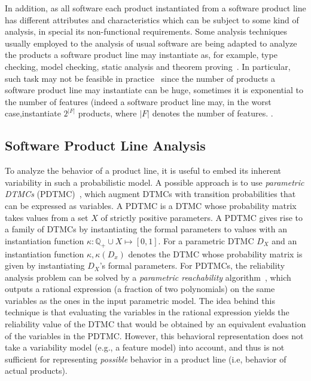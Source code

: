 In addition,  as all software each product instantiated from a software product line has
 different attributes and characteristics which can be subject to some kind of
 analysis, in special its non-functional requirements. Some analysis techniques
 usually employed to the analysis of usual software are being adapted to analyze
 the products a software product line may instantiate as, for example, type
 checking, model checking, static analysis and theorem
 proving~\cite{thum_classification_2014}. In particular, such task may not be
 feasible in practice~\cite{classen_featured_2013} since  the number of
 products a software product line may instantiate can be huge, sometimes it is
 exponential to the number of features (indeed a software product line may, in
 the worst case,instantiate $2^{|F|}$ products, where $|F|$ denotes the number
 of features.  . 






\subsection{ Software Product Line Analysis
	\label{subsec:softwareProductLineAnalysis}}

To analyze the behavior of a product line, it is useful to embed its inherent
variability in such a probabilistic model.  A possible approach is to use
\textit{parametric DTMCs} (PDTMC)~\cite{daws_pmc}, which augment DTMCs with
transition probabilities that can be expressed as variables. A PDTMC is a DTMC
whose probability matrix takes values from a set $X$ of strictly positive
parameters. A PDTMC gives rise to a family of DTMCs by instantiating the formal
parameters to values with an instantiation function $\kappa : \mathbb{Q}_+ \cup
X \mapsto [0,1]$. For a parametric DTMC $D_X$ and an instantiation function
$\kappa, \kappa(D_x)$ denotes the DTMC whose probability matrix is given by
instantiating $D_X$'s formal parameters. For PDTMCs, the reliability analysis
problem can be solved by a \emph{parametric reachability}
algorithm~\cite{HahnHZ10}, which outputs a rational expression (a fraction of
two polynomials) on the same variables as the ones in the input parametric
model.  The idea behind this technique is that evaluating the variables in the
rational expression yields the reliability value of the DTMC that would be
obtained by an equivalent evaluation of the variables in the PDTMC.  However,
this behavioral representation  does not take a variability model (e.g., a
feature model) into account, and thus is not sufficient for representing
\emph{possible} behavior in a product line (i.e, behavior of actual products).


